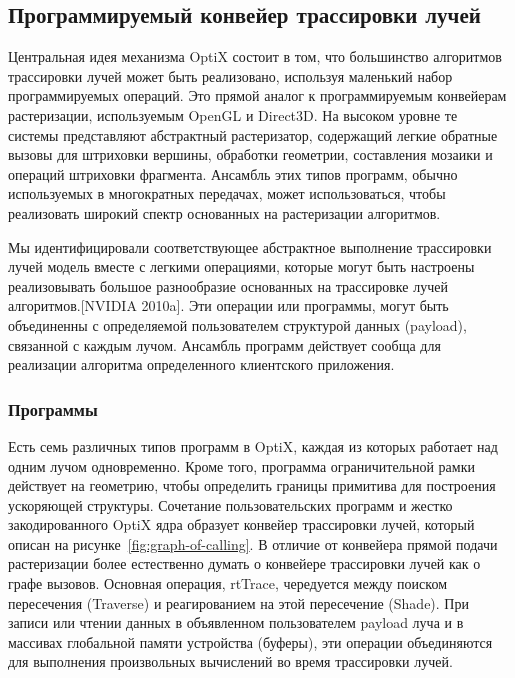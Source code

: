 \subsection{Программируемый конвейер трассировки лучей}
Центральная идея механизма OptiX состоит в том, что большинство алгоритмов трассировки лучей может быть реализовано, используя маленький набор программируемых операций. 
Это прямой аналог к программируемым конвейерам растеризации, используемым OpenGL и Direct3D. 
На высоком уровне те системы представляют абстрактный растеризатор, содержащий легкие обратные вызовы для штриховки вершины, обработки геометрии, составления мозаики и операций штриховки фрагмента. 
Ансамбль этих типов программ, обычно используемых в многократных передачах, может использоваться, чтобы реализовать широкий спектр основанных на растеризации алгоритмов. 
 
Мы идентифицировали соответствующее абстрактное выполнение трассировки лучей модель вместе с легкими операциями, которые могут быть настроены реализовывать большое разнообразие основанных на трассировке лучей алгоритмов.[NVIDIA 2010a]. 
Эти операции или программы, могут быть объединенны с определяемой пользователем структурой данных (payload), связанной с каждым лучом. 
Ансамбль программ действует сообща для реализации алгоритма определенного клиентского приложения.

\subsubsection{Программы}
Есть семь различных типов программ в OptiX, каждая из которых работает над одним лучом одновременно.
Кроме того, программа ограничительной рамки действует на геометрию, чтобы определить границы примитива для построения ускоряющей структуры.
Сочетание пользовательских программ и жестко закодированного OptiX ядра образует конвейер трассировки лучей, который описан на рисунке~\ref{fig:graph-of-calling}. 
В отличие от конвейера прямой подачи растеризации более естественно думать о конвейере трассировки лучей как о графе вызовов.
Основная операция, rtTrace, чередуется между поиском пересечения (Traverse) и реагированием на этой пересечение (Shade).
При записи или чтении данных в объявленном пользователем payload луча и в массивах глобальной памяти устройства (буферы), эти операции объединяются для выполнения произвольных вычислений во время трассировки лучей.

